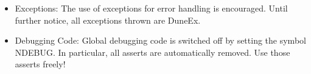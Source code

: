 \begin{itemize}
\begin{itemize}
\item Method Parameters
\item Template Parameters
\item Return Values
\item Exceptions thrown by a method
 \end{itemize}
     Since we all know that writing documentation is not well-liked and is frequently defered to some vague 
'next week', we herewith proclaim the Doc-Me Dogma . It goes like this: Whatever you do, and in whatever hurry you 
happen to be, please document everything at least with a {\verb /** $\backslash$todo Please doc me! */}. That way at least the absence 
of documentation is documented, and it is easier to get rid of it systematically.
\item Exceptions:
      The use of exceptions for error handling is encouraged. Until further notice, all exceptions thrown are DuneEx.
\item Debugging Code:
      Global debugging code is switched off by setting the symbol NDEBUG. In particular, all asserts are 
automatically removed. Use those asserts freely!
\end{itemize}
